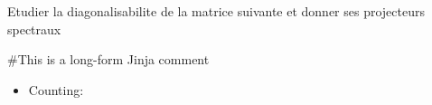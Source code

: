 \documentclass{article}%
\begin{document}
\normalsize%
Etudier la diagonalisabilite de la matrice suivante et donner ses projecteurs spectraux \newline%

\#{This is a long-form Jinja comment}
\begin{itemize}
  \item Counting: 
\end{itemize}
\end{document}
